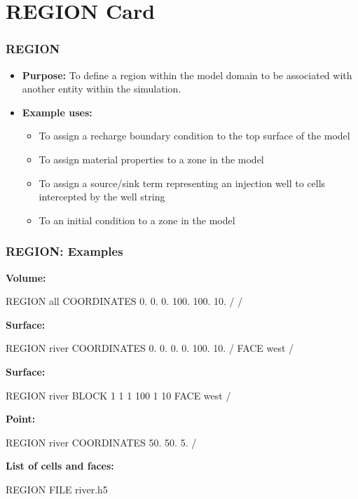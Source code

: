 \section{REGION Card}

\begin{frame}\frametitle{REGION}

\begin{itemize}{}
\item[] \textbf{Purpose:} To define a region within the model domain to be associated with another entity within the simulation.
\item[] \textbf{Example uses:}
\begin{itemize}
  \item To assign a recharge boundary condition to the top surface of the model
  \item To assign material properties to a zone in the model
  \item To assign a source/sink term representing an injection well to cells intercepted by the well string
  \item To an initial condition to a zone in the model
\end{itemize}
\end{itemize}

\end{frame}


\begin{frame}[fragile]\frametitle{REGION: Examples}

\scriptsize
\begin{multicols}{2}

\textbf{Volume:}
\begin{semiverbatim}
REGION all
  COORDINATES
    0. 0. 0.
    100. 100. 10.
  /
/
\end{semiverbatim}
\textbf{Surface:}
\begin{semiverbatim}
REGION river
  COORDINATES
    0. 0. 0.
    0. 100. 10.
  /
  FACE west
/
\end{semiverbatim}

\textbf{Surface:}
\begin{semiverbatim}
REGION river
  BLOCK 1 1 1 100 1 10
  FACE west
/
\end{semiverbatim}

\textbf{Point:}
\begin{semiverbatim}
REGION river
  COORDINATES 50. 50. 5.
/
\end{semiverbatim}

\textbf{List of cells and faces:}
\begin{semiverbatim}
REGION FILE river.h5
\end{semiverbatim}


\end{multicols}

\end{frame}

